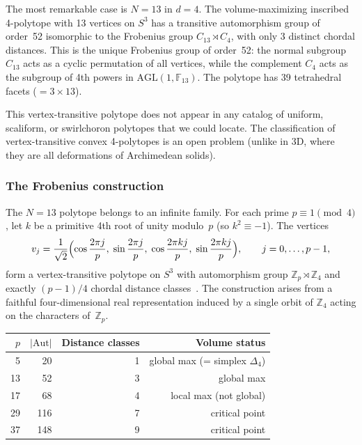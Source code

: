 \documentclass[11pt]{article}
\begin{document}
The most remarkable case is $N = 13$ in $d = 4$. The volume-maximizing
inscribed 4-polytope with 13 vertices on $S^3$ has a transitive
automorphism group of order~52 isomorphic to the Frobenius group
$C_{13} \rtimes C_4$, with only 3 distinct chordal distances.
This is the unique Frobenius group of order~52: the normal subgroup
$C_{13}$ acts as a cyclic permutation of all vertices, while the
complement $C_4$ acts as the subgroup of 4th powers in
$\mathrm{AGL}(1, \mathbb{F}_{13})$.
The polytope has 39 tetrahedral facets ($= 3 \times 13$).

This vertex-transitive polytope does not appear in any catalog of
uniform, scaliform, or swirlchoron polytopes that we could locate.
The classification of vertex-transitive convex 4-polytopes is an
open problem (unlike in 3D, where they are all deformations of
Archimedean solids).

\subsubsection{The Frobenius construction}

The $N = 13$ polytope belongs to an infinite family.  For each prime
$p \equiv 1 \pmod{4}$, let $k$ be a primitive 4th root of unity
modulo~$p$ (so $k^2 \equiv -1$).  The vertices
\[
  v_j = \frac{1}{\sqrt{2}}\Bigl(
    \cos\frac{2\pi j}{p},\;
    \sin\frac{2\pi j}{p},\;
    \cos\frac{2\pi kj}{p},\;
    \sin\frac{2\pi kj}{p}
  \Bigr), \qquad j = 0,\ldots,p-1,
\]
form a vertex-transitive polytope on $S^3$ with automorphism
group $\mathbb{Z}_p \rtimes \mathbb{Z}_4$ and exactly $(p-1)/4$ chordal distance
classes~\cite{FrobeniusNote}.  The construction arises from a
faithful four-dimensional real representation induced by a single orbit
of $\mathbb{Z}_4$ acting on the characters of~$\mathbb{Z}_p$.

\begin{center}
\begin{tabular}{r r r r}
\toprule
$p$ & $|{\mathrm{Aut}}|$ & Distance classes & Volume status \\
\midrule
5  & 20  & 1 & global max (= simplex $\Delta_4$) \\
13 & 52  & 3 & global max \\
17 & 68  & 4 & local max (not global) \\
29 & 116 & 7 & critical point \\
37 & 148 & 9 & critical point \\
\bottomrule
\end{tabular}
\end{center}
\end{document}
